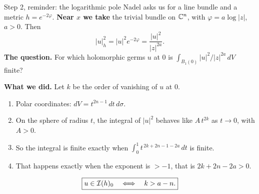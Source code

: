 \begin{frame}{Step 2, reminder: the logarithmic pole}
\label{fr:mi-logpole}
Nadel asks us for a line bundle and a metric \(h=e^{-2\varphi}\). \textbf{Near \(x\) we take} the trivial bundle on \(\mathbb C^n\), with \(\varphi=a\log|z|\), \(a>0\). Then
\[
|u|_h^2=|u|^2e^{-2\varphi}=\frac{|u|^2}{|z|^{2a}} .
\]
\textbf{The question.} For which holomorphic germs \(u\) at \(0\) is \(\int_{B_1(0)}|u|^2/|z|^{2a}\,dV\) finite?
\par\medskip
\textbf{What we did.} Let \(k\) be the order of vanishing of \(u\) at \(0\).
\begin{enumerate}
\item Polar coordinates: \(dV=t^{2n-1}\,dt\,d\sigma\).
\item On the sphere of radius \(t\), the integral of \(|u|^2\) behaves like \(A\,t^{2k}\) as \(t\to0\), with \(A>0\).
\item So the integral is finite exactly when \(\int_0^1t^{\,2k+2n-1-2a}\,dt\) is finite.
\item That happens exactly when the exponent is \(>-1\), that is \(2k+2n-2a>0\).
\end{enumerate}
\[
\boxed{u\in\mathcal I(h)_0\quad\Longleftrightarrow\quad k>a-n .}
\]
\end{frame}

